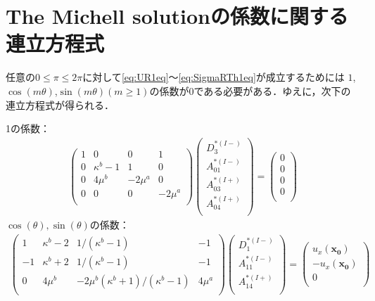 \section{The Michell solutionの係数に関する連立方程式}

任意の$0\leq\pi\leq2\pi$に対して\eqref{eq:UR1eq}～\eqref{eq:SigmaRTh1eq}が成立するためには
$1$,$\cos(m\theta)$,$\sin(m\theta)$$(m\geq1)$の係数が0である必要がある．ゆえに，次下の連立方程式が得られる．

1の係数：
\begin{align}
	\left(
	\begin{array}{cccc}
		1& 0 & 0 & 1 \\
		0 & \kappa^b-1 & 1 & 0 \\
		0 & 4\mu^{b} & -2\mu^{a} & 0 \\
		0 & 0 & 0 & -2\mu^{a} \\
	\end{array}
	\right)
	\left(
	\begin{array}{c}
		D_{3}^{*(I-)} \\
	 	A_{01}^{*(I-)} \\
		A_{03}^{*(I+)}\\
	 	A_{04}^{*(I+)} \\
	\end{array}
	\right)
	=
	\left(
	\begin{array}{c}
		0 \\
	 	0 \\
		0 \\
	 	0 \\
	\end{array}
	\right)
\end{align}
$\cos(\theta),\sin(\theta)$の係数：
\begin{align}
	\left(
	\begin{array}{cccc}
		1& \kappa^b-2 & 1/(\kappa^b-1) & -1 \\
		-1 & \kappa^b+2 & 1/(\kappa^b-1) & -1 \\
		0 & 4\mu^{b} & -2\mu^{b}(\kappa^b+1)/(\kappa^b-1) & 4\mu^{a} \\
	\end{array}
	\right)
	\left(
	\begin{array}{c}
		D_{1}^{*(I-)} \\
	 	A_{11}^{*(I-)} \\
	 	A_{14}^{*(I+)} \\
	\end{array}
	\right)
	=
	\left(
	\begin{array}{c}
		u_{x}(\bm{x_{0}}) \\
	 	-u_{x}(\bm{x_{0}}) \\
	 	0 \\
	\end{array}
	\right)
\end{align}
